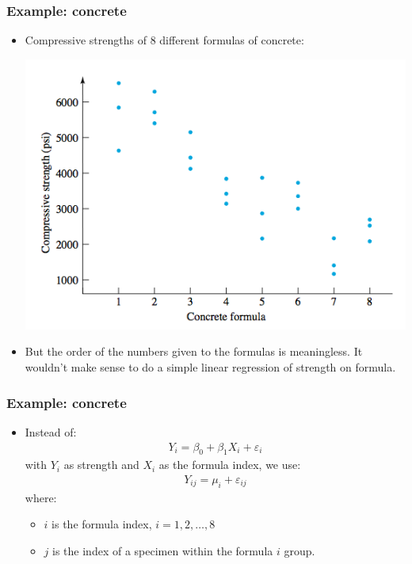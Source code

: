 \documentclass[handout]{beamer}\usepackage[]{graphicx}\usepackage[]{color}
\providecommand{\e}{\varepsilon}
\numberwithin{equation}{section}
\begin{document}
\begin{frame}
\frametitle{Example: concrete}
\begin{itemize}
\item Compressive strengths of 8 different formulas of concrete:
\begin{center}
 \includegraphics{../../fig/concreteplot.png}
\end{center}
\pause \item But the order of the numbers given to the formulas is meaningless. It wouldn't make sense to do a simple linear regression of strength on formula.
\end{itemize}
\end{frame}

\begin{frame}
\frametitle{Example: concrete}
\begin{itemize}
\item Instead of:
\pause \begin{align*}
Y_i = \beta_0 + \beta_1 X_i + \e_i
\end{align*}
\pause with $Y_i$ as strength and $X_i$ as the formula index, we use:
\pause \begin{align*}
Y_{ij} = \mu_{i} + \e_{ij}
\end{align*}
where:
\begin{itemize}
\pause \item $i$ is the formula index, $i = 1, 2, \ldots, 8$
\pause \item $j$ is the index of a specimen within the formula $i$ group.
\end{itemize}
\end{itemize}
\end{frame}
\end{document}
